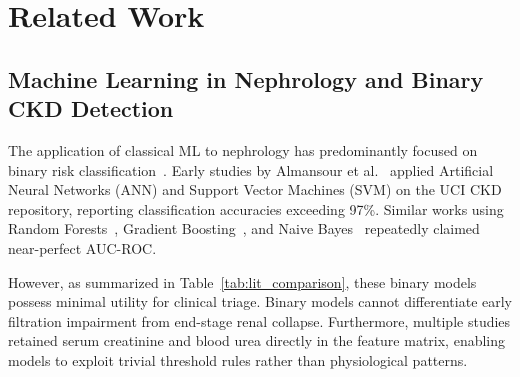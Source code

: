 \documentclass[10pt,conference]{IEEEtran}
\begin{document}
\section{Related Work}
\subsection{Machine Learning in Nephrology and Binary CKD Detection}
The application of classical ML to nephrology has predominantly focused on binary risk classification~\cite{chittora2021efficient, boukenze2016predicting, misir2022performance}. Early studies by Almansour et al.~\cite{almansour2019neural} applied Artificial Neural Networks (ANN) and Support Vector Machines (SVM) on the UCI CKD repository, reporting classification accuracies exceeding 97\%. Similar works using Random Forests~\cite{senan2021machine}, Gradient Boosting~\cite{debal2022comparative}, and Naive Bayes~\cite{rubini2015prediction} repeatedly claimed near-perfect AUC-ROC.

However, as summarized in Table~\ref{tab:lit_comparison}, these binary models possess minimal utility for clinical triage. Binary models cannot differentiate early filtration impairment from end-stage renal collapse. Furthermore, multiple studies retained serum creatinine and blood urea directly in the feature matrix, enabling models to exploit trivial threshold rules rather than physiological patterns.
\end{document}
